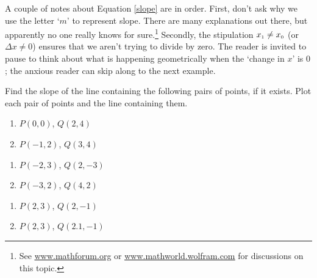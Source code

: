 \documentclass{ximera}
\begin{document}
A couple of notes about Equation \ref{slope} are in order.  First, don't ask why we use the letter `$m$' to represent slope.  There are many explanations out there, but apparently no one really knows for sure.\footnote{See  \href{http://mathforum.org/dr.math/faq/faq.terms.html}{\underline{www.mathforum.org}} or \href{http://mathworld.wolfram.com/Slope.html}{\underline{www.mathworld.wolfram.com}} for discussions on this topic.} Secondly, the stipulation  $x_{\mbox{\tiny$1$}} \neq x_{\mbox{\tiny$0$}}$ (or $\Delta x \neq 0$) ensures that we aren't trying to divide by zero.  The reader is invited to pause to think about what is happening geometrically when the `change in $x$' is $0$; the anxious reader can skip along to the next example.

\begin{example}  Find the slope of the line containing the following pairs of points, if it exists.  Plot each pair of points and the line containing them.

\begin{multicols}{2}
\begin{enumerate}

\item  $P(0,0)$, $Q(2,4)$
\item  $P(-1,2)$, $Q(3,4)$

\setcounter{HW}{\value{enumi}}
\end{enumerate}
\end{multicols}

\begin{multicols}{2}
\begin{enumerate}
\setcounter{enumi}{\value{HW}}

\item  $P(-2,3)$, $Q(2,-3)$
\item  $P(-3,2)$, $Q(4,2)$

\setcounter{HW}{\value{enumi}}
\end{enumerate}
\end{multicols}

\begin{multicols}{2}
\begin{enumerate}
\setcounter{enumi}{\value{HW}}

\item  $P(2,3)$, $Q(2,-1)$
\item  $P(2,3)$, $Q(2.1, -1)$

\end{enumerate}
\end{multicols}


\end{example}
\end{document}
